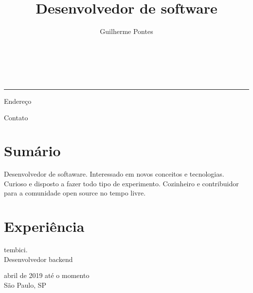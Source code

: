 \documentclass{article}
\newcommand{\hr}{
    \noindent\parbox{\linewidth}{\rule[5pt]{\textwidth}{1pt}}%
}
\renewcommand{\maketitle}{
    \noindent
    {\Large\bfseries\theauthor} \\
    {\large\color{sec}{\thetitle}} \\
    \hr
}
\begin{document}
\author{Guilherme Pontes}
\title{Desenvolvedor de software}

\maketitle
\begin{multicols}{2}
    \noindent%
    \begin{flushleft}
        \noindent%
        Endereço \\
        \color{sec}{
            Rua Antônio Rosa Machado \\
            Vila Campo Grande \\
            São Paulo, SP \\
            19 anos
        }
    \end{flushleft}
    \columnbreak
    \begin{flushright}
        \noindent
        Contato \\
        \color{sec}{
            +55 11 99213-9309 \\
            pontes.guisilva@gmail.com \\
            linkedin.com/in/gpontesss \\
            github.com/gpontesss
        }
    \end{flushright}
\end{multicols}

\section{Sum\'ario}

Desenvolvedor de softaware. Interessado em novos conceitos e tecnologias.
Curioso e disposto a fazer todo tipo de experimento. Cozinheiro e contribuidor
para a comunidade open source no tempo livre.

\section{Experi\^{e}ncia}

\begin{multicols}{2}
    \noindent
    \begin{flushleft}
        tembici. \\
        Desenvolvedor backend
    \end{flushleft}
    \columnbreak
    \begin{flushright}
        abril de 2019 até o momento \\
        São Paulo, SP
    \end{flushright}
\end{multicols}
\end{document}
